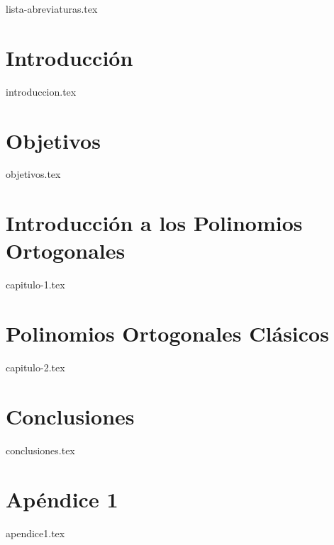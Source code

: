 \documentclass[twoside,openright,11pt]{report}
\begin{document}
{lista-abreviaturas.tex}

\listoffigures
\thispagestyle{plain}



\chapter*{Introducción}

{introduccion.tex}

\chapter*{Objetivos}
\label{chap:Objetivos}

{objetivos.tex}

\chapter{Introducción a los Polinomios Ortogonales}
\label{chap:introduccionPO}

{capitulo-1.tex}

\chapter{Polinomios Ortogonales Clásicos}
\label{chap:clasicos}

{capitulo-2.tex}

\chapter*{Conclusiones}
\label{chap:conclusiones}

{conclusiones.tex}

\nocite{*}
{}



\appendix
\cleardoublepage
{}


\chapter{Apéndice 1}
\label{appendix:apendice1}

{apendice1.tex}
\end{document}
